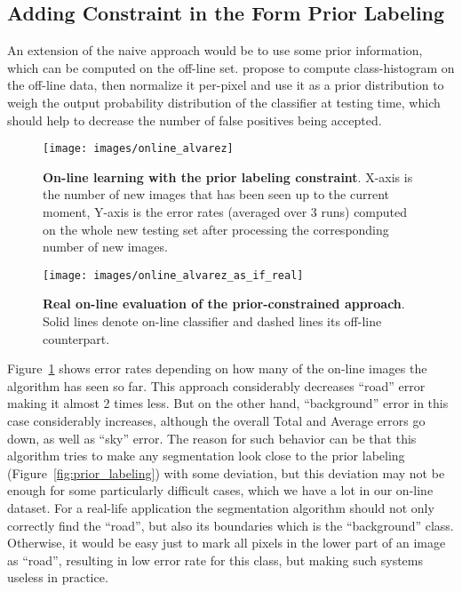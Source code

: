 \subsection{Adding Constraint in the Form Prior Labeling}

An extension of the naive approach would be to use some prior information, which can be computed on the off-line set. \cite{Alvarez2012} propose to compute
class-histogram on the off-line data, then normalize it per-pixel and use it as a prior distribution to weigh the output probability distribution 
of the classifier at testing time, which should help to decrease the number of false positives being accepted.

\begin{figure}[ht]
 \centering
 \texttt{[image: images/online\_alvarez]}
 \caption[On-line learning with the prior labeling constraint]{
 {\bf On-line learning with the prior labeling constraint}.
  X-axis is the number of new images that has been seen up to the current moment, Y-axis is the error rates (averaged over 3 runs)
  computed on the whole new testing set after processing the corresponding number of new images.
 }
 \label{fig:online_alvarez}
\end{figure}

\begin{figure}[ht]
 \centering
 \texttt{[image: images/online\_alvarez\_as\_if\_real]}
 \caption[Real on-line evaluation of the prior-constrained approach]{
 {\bf Real on-line evaluation of the prior-constrained approach}.
 Solid lines denote on-line classifier and dashed lines  its off-line counterpart.}
 \label{fig:online_alvarez_as_if_real}
\end{figure}

Figure~\ref{fig:online_alvarez} shows error rates depending on how many of the on-line images the algorithm has seen so far. This approach considerably
decreases ``road'' error making it almost 2 times less. But on the other hand, ``background'' error in this case considerably increases, although
the overall Total and Average errors go down, as well as ``sky'' error. The reason for such behavior can be that this algorithm tries to make any
segmentation look close to the prior labeling (Figure~\ref{fig:prior_labeling}) with some deviation, but this deviation may not be enough for some particularly
difficult cases, which we have a lot in our on-line dataset. For a real-life application the segmentation algorithm should not only correctly find
the ``road'', but also its boundaries which is the ``background'' class. Otherwise, it would be easy just to mark all pixels in the lower part of
an image as ``road'', resulting in low error rate for this class, but making such systems useless in practice.

